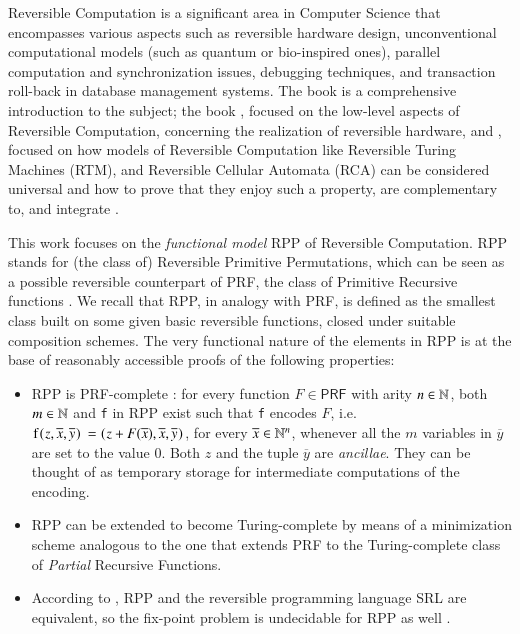 \documentclass[preprint]{elsarticle}
\theoremstyle{remark}
\newcommand{\RPP}{\textsf{RPP}\xspace}
\newcommand{\PRF}{\textsf{PRF}\xspace}
\newcommand{\SRL}{\textsf{SRL}\xspace}
\begin{document}
Reversible Computation is a significant area in Computer Science that encompasses various aspects such as reversible hardware design, unconventional computational models (such as quantum or bio-inspired ones), parallel computation and synchronization issues, debugging techniques, and transaction roll-back in database management systems.
The book \cite{perumalla2013chc} is a comprehensive introduction to the subject; the book \cite{DBLP:books/daglib/0025734}, focused on the low-level aspects of Reversible Computation, concerning the realization of reversible hardware, and
\cite{DBLP:series/eatcs/Morita17}, focused on how models of Reversible Computation like Reversible Turing Machines (RTM), and Reversible Cellular Automata (RCA) can be considered universal and how to prove that they enjoy such a property, are complementary to, and integrate \cite{perumalla2013chc}.

This work focuses on the \emph{functional model} \RPP \cite{DBLP:journals/tcs/PaoliniPR20} of Reversible Computation.
\RPP stands for (the class of) Reversible Primitive Permutations, which can be seen as a possible reversible counterpart of \PRF, the class of Primitive Recursive functions \cite{rogers1967theory}.
We recall that \RPP, in analogy with \PRF, is defined as the smallest class built on some given basic reversible functions, closed under suitable composition schemes.
The very functional nature of the elements in \RPP is at the base of reasonably accessible proofs of the following properties:
\begin{itemize}
\item \RPP is \PRF-complete \cite{DBLP:journals/tcs/PaoliniPR20}: for every function $ F \in \PRF $ with arity $ n \in \mathbb{N} $, both $ m \in \mathbb{N} $ and \lstinline|f| in \RPP exist such that \lstinline|f| encodes $ F $, i.e.
$ \mbox{\lstinline|f(|}z,\overline{x},\overline{y}\mbox{\lstinline|) = (|}z+F(\overline{x}),\overline{x},\overline{y}\mbox{\lstinline|)|}$, for every $ \overline{x}\in \mathbb{N}^n $, whenever all the $m$ variables in $ \overline{y} $ are set to the value $ 0 $.
Both $ z $ and the tuple $ \overline{y} $ are \emph{ancillae}. They can be thought of as temporary storage for intermediate computations of the encoding.

\item \RPP can be extended to become Turing-complete \cite{Paolini2018NGC} by means of a minimization scheme analogous to the one that extends \PRF to the Turing-complete class of \emph{Partial} Recursive Functions.

\item According to \cite{MatosRC2020}, \RPP and the reversible programming language \SRL \cite{matos03tcs} are equivalent, so the fix-point problem is undecidable for \RPP as well \cite{2318_1734164MatosPaoliniRoversiTCSICTCS18}.
\end{itemize}
\end{document}

